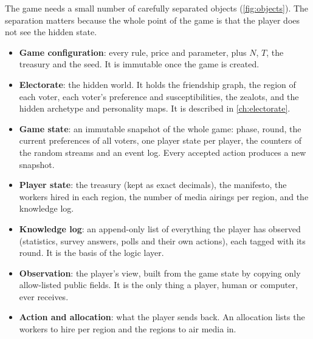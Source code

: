 \documentclass[11pt,a4paper,oneside]{report}
\begin{document}
The game needs a small number of carefully separated objects (\cref{fig:objects}). The separation matters
because the whole point of the game is that the player does not see the hidden state.
\begin{itemize}
  \item \textbf{Game configuration}: every rule, price and parameter, plus $N$, $T$, the treasury and the
        seed. It is immutable once the game is created.
  \item \textbf{Electorate}: the hidden world. It holds the friendship graph, the region of each voter,
        each voter's preference and susceptibilities, the zealots, and the hidden archetype and
        personality maps. It is described in \cref{ch:electorate}.
  \item \textbf{Game state}: an immutable snapshot of the whole game: phase, round, the current
        preferences of all voters, one player state per player, the counters of the random streams and an
        event log. Every accepted action produces a new snapshot.
  \item \textbf{Player state}: the treasury (kept as exact decimals), the manifesto, the workers hired in
        each region, the number of media airings per region, and the knowledge log.
  \item \textbf{Knowledge log}: an append-only list of everything the player has observed (statistics,
        survey answers, polls and their own actions), each tagged with its round. It is the basis of the
        logic layer.
  \item \textbf{Observation}: the player's view, built from the game state by copying only allow-listed
        public fields. It is the only thing a player, human or computer, ever receives.
  \item \textbf{Action and allocation}: what the player sends back. An allocation lists the workers to hire
        per region and the regions to air media in.
\end{itemize}
\end{document}

